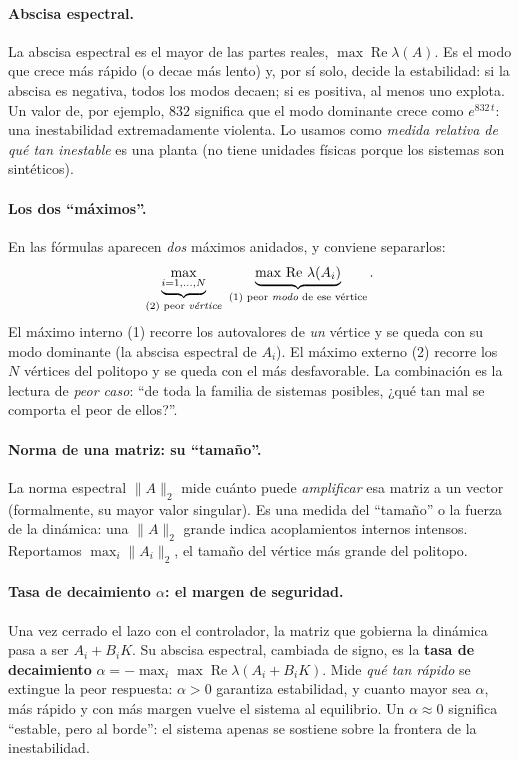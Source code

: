 \paragraph{Abscisa espectral.}
La abscisa espectral es el mayor de las partes reales,
$\max\operatorname{Re}\lambda(A)$. Es el modo que crece más rápido (o decae más
lento) y, por sí solo, decide la estabilidad: si la abscisa es negativa, todos
los modos decaen; si es positiva, al menos uno explota. Un valor de, por
ejemplo, $832$ significa que el modo dominante crece como $e^{832\,t}$: una
inestabilidad extremadamente violenta. Lo usamos como \emph{medida relativa de
qué tan inestable} es una planta (no tiene unidades físicas porque los sistemas
son sintéticos).

\paragraph{Los dos ``máximos''.}
En las fórmulas aparecen \emph{dos} máximos anidados, y conviene separarlos:
%
\begin{equation*}
  \underbrace{\max_{i=1,\dots,N}}_{\text{(2) peor \emph{vértice}}}
  \ \underbrace{\max\,\operatorname{Re}\,\lambda(A_i)}_{\text{(1) peor \emph{modo} de ese vértice}}.
\end{equation*}
%
El máximo interno (1) recorre los autovalores de \emph{un} vértice y se queda
con su modo dominante (la abscisa espectral de $A_i$). El máximo externo (2)
recorre los $N$ vértices del politopo y se queda con el más desfavorable. La
combinación es la lectura de \emph{peor caso}: ``de toda la familia de sistemas
posibles, ¿qué tan mal se comporta el peor de ellos?''.

\paragraph{Norma de una matriz: su ``tamaño''.}
La norma espectral $\lVert A\rVert_2$ mide cuánto puede \emph{amplificar} esa
matriz a un vector (formalmente, su mayor valor singular). Es una medida del
``tamaño'' o la fuerza de la dinámica: una $\lVert A\rVert_2$ grande indica
acoplamientos internos intensos. Reportamos $\max_i\lVert A_i\rVert_2$, el
tamaño del vértice más grande del politopo.

\paragraph{Tasa de decaimiento $\alpha$: el margen de seguridad.}
Una vez cerrado el lazo con el controlador, la matriz que gobierna la dinámica
pasa a ser $A_i+B_iK$. Su abscisa espectral, cambiada de signo, es la
\textbf{tasa de decaimiento}
$\alpha=-\max_i\max\operatorname{Re}\lambda(A_i+B_iK)$. Mide \emph{qué tan
rápido} se extingue la peor respuesta: $\alpha>0$ garantiza estabilidad, y
cuanto mayor sea $\alpha$, más rápido y con más margen vuelve el sistema al
equilibrio. Un $\alpha\approx0$ significa ``estable, pero al borde'': el sistema
apenas se sostiene sobre la frontera de la inestabilidad.


